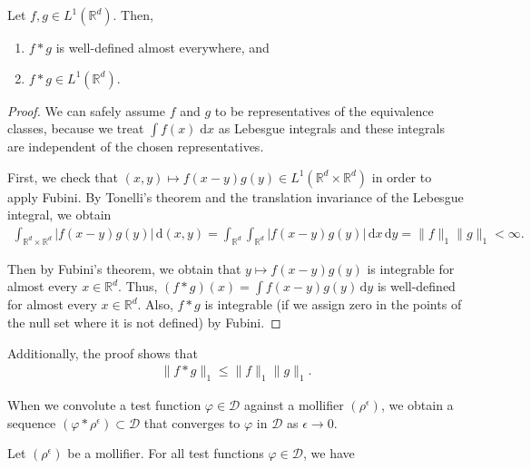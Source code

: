 \begin{lemma}
    Let \(f,g \in {L}^1(\mathbb{R}^d)\). Then, 
    \begin{enumerate}
        \item \(f*g\) is well-defined almost everywhere, and 
        \item \(f*g \in {L}^1(\mathbb{R}^d)\).
    \end{enumerate}
\end{lemma}
\begin{proof}
    We can safely assume \(f\) and \(g\) to be representatives of the equivalence classes, because we  treat \(\int f(x) \; \mathrm{d}x\) as Lebesgue integrals and these integrals are independent of the chosen representatives.

    First, we check that \((x,y) \mapsto f(x-y)g(y) \in L^1(\mathbb{R}^d \times \mathbb{R}^d)\) in order to apply Fubini. By Tonelli's theorem and the translation invariance of the Lebesgue integral, we obtain
    \begin{align*}
        \int_{\mathbb{R}^d \times \mathbb{R}^d}|f(x-y)g(y)| \, \mathrm{d}(x,y) = \int_{\mathbb{R}^d}\int_{\mathbb{R}^d} |f(x-y)g(y)| \, \mathrm{d}x \, \mathrm{d}y = \lVert f \rVert_{1} \lVert g \rVert_{1} < \infty.
    \end{align*}

    Then by Fubini's theorem, we obtain that \(y \mapsto f(x-y)g(y)\) is integrable for almost every \(x \in \mathbb{R}^d\). Thus, \((f*g)(x) = \int f(x-y)g(y) \, \mathrm{d}y\) is well-defined for almost every \(x \in \mathbb{R}^d\). Also, \(f*g\) is integrable (if we assign zero in the points of the null set where it is not defined) by Fubini.
\end{proof}
Additionally, the proof shows that
\begin{align}\label{inequality:l1-norm}
    \lVert f*g \rVert_1 \leq \lVert f \rVert_{1} \lVert g \rVert_{1}.
\end{align}

When we convolute a test function \(\varphi \in \mathcal{D}\) against a mollifier \((\rho^\epsilon)\), we obtain a sequence \((\varphi * \rho^\epsilon) \subset \mathcal{D}\) that converges to \({\varphi}\) in \(\mathcal{D}\) as \(\epsilon \to 0\).  

\begin{lemma}\label{mollifier-lemma}
    Let \((\rho^\epsilon)\) be a mollifier. For all test functions \(\varphi \in \mathcal{D}\), we have
\end{lemma}

